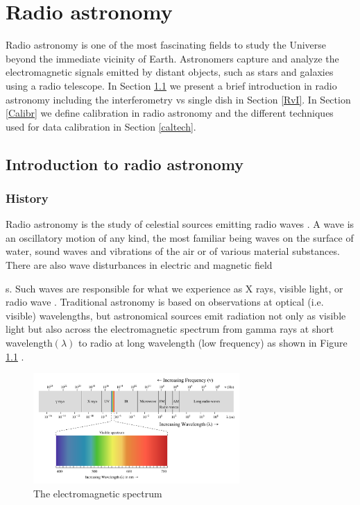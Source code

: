 \chapter{Radio astronomy}



Radio astronomy is one of the most fascinating fields to study the Universe beyond the immediate vicinity of Earth. Astronomers capture and analyze the electromagnetic signals emitted by distant objects, such as stars and galaxies using a radio telescope. In Section \ref{Ra} we present a brief introduction in radio astronomy including the interferometry vs single dish in Section \ref{RvI}. In Section \ref{Calibr} we define calibration in radio astronomy and the different techniques used for data calibration in Section \ref{caltech}. 
\section{Introduction to radio astronomy}
\label{Ra}
\subsection{History}


Radio astronomy is the study of celestial sources emitting radio waves \citep{verschuur2015invisible}. A wave is an oscillatory motion of any kind, the most familiar being waves on the surface of water, sound waves and vibrations of the air or of various material substances. There are also wave disturbances in electric and magnetic field\newtheorem{mydef}{Definition}s. Such waves are responsible for what we experience as X rays, visible light, or radio wave \citep{cassidy2002wave}. Traditional astronomy is based on observations at optical (i.e. visible) wavelengths, but astronomical sources emit radiation not only as visible light but
also across the electromagnetic spectrum from gamma rays at short wavelength$(\lambda)$ to radio at long wavelength (low frequency) as shown in Figure \ref{images/Electromagnetic-Spectrum.png} \citep{staats2016genetic}.

\begin{figure}[h!]
  \centering
    \includegraphics[width=0.7\textwidth]{images/Electromagnetic-Spectrum.png}
    \caption{The electromagnetic spectrum}
  \label{images/Electromagnetic-Spectrum.png}
\end{figure}

